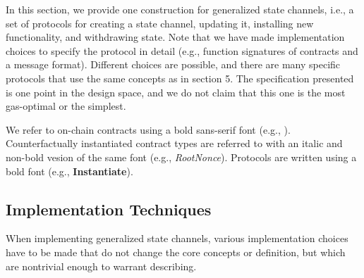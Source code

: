 \documentclass[prb,floatfix,reprint,nofootinbib,amsmath,amssymb,epsfig,pre,floats,letterpaper,groupedaffiliation,tightenlines,allcolors=blue,11pt]{revtex4}
\theoremstyle{definition}
\theoremstyle{definition}
\theoremstyle{definition}
\begin{document}
\newcommand{\rootnonce}{\textit{\textsf{RootNonce}}}
\newcommand{\paymentchannel}{\textit{\textsf{PaymentChannel}}}
\newcommand{\balancerefund}{\textit{\textsf{BalanceRefund}}}
\newcommand{\poker}{\textsf{\textit{Poker}}}
\newcommand{\proxycontract}{\textit{\textsf{ProxyContract}}}
\newcommand{\ProxyContract}{\textit{\textsf{ProxyContract}}}

\newcommand{\SignCommitment}{\textsf{\textbf{SignCommitment}}}
\newcommand{\Instantiate}{\textsf{\textbf{Instantiate}}}
\newcommand{\InstantiateWithExplicitOwners}{\textsf{\textbf{InstantiateWithExplicitOwners}}}
\newcommand{\CommitWithdrawal}{\textsf{\textbf{CommitWithdrawal}}}
\newcommand{\Update}{\textsf{\textbf{Update}}}


\renewcommand{\P}{\mathcal{P}}

In this section, we provide one construction for generalized state channels, i.e., a set of protocols for creating a state channel, updating it, installing new functionality, and withdrawing state. Note that we have made implementation choices to specify the protocol in detail (e.g., function signatures of contracts and a message format). Different choices are possible, and there are many specific protocols that use the same concepts as in section 5. The specification presented is one point in the design space, and we do not claim that this one is the most gas-optimal or the simplest.

We refer to on-chain contracts using a bold sans-serif font (e.g., \multisig). Counterfactually instantiated contract types are referred to with an italic and non-bold vesion of the same font (e.g., \textit{\textsf{RootNonce}}). Protocols are written using a bold font (e.g., \Instantiate).

\subsection{Implementation Techniques}

When implementing generalized state channels, various implementation choices have to be made that do not change the core concepts or definition, but which are nontrivial enough to warrant describing.
\end{document}
